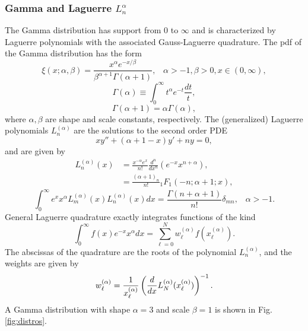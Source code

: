 \subsubsection{Gamma and Laguerre $L_n^\alpha$}
The Gamma distribution has support from 0 to $\infty$ and is characterized by Laguerre polynomials with the associated Gauss-Laguerre quadrature.  The pdf of the Gamma distribution has the form
\begin{equation}
\xi(x;\alpha,\beta)=\frac{x^\alpha e^{-x/\beta}}{\beta^{\alpha+1}\Gamma(\alpha+1)},
    \hspace{10pt}\alpha>-1,\beta>0,x\in(0,\infty),
\end{equation}
\begin{equation}
\Gamma(\alpha)\equiv\int_0^\infty t^\alpha e^{-t}\frac{dt}{t},
\end{equation}
\begin{equation}
\Gamma(\alpha+1)=\alpha\Gamma(\alpha),
\end{equation}
where $\alpha,\beta$ are shape and scale constants, respectively.  The (generalized) Laguerre polynomials $L^{(\alpha)}_n$ are the solutions to the second order PDE
\begin{equation}
xy''+(\alpha+1-x)y'+ny=0,
\end{equation}
and are given by
\begin{align}
L^{(\alpha)}_n(x)&=\frac{x^{-\alpha}e^x}{n!}\frac{d^n}{dx^n}\left(e^{-x}x^{n+\alpha}\right),\\
  &=\frac{(\alpha+1)_n}{n!} {}_1F_1(-n;\alpha+1;x),
\end{align}
\begin{equation}
\int_0^\infty e^x x^\alpha L^{(\alpha)}_m(x) L^{(\alpha)}_n(x)dx=\frac{\Gamma(n+\alpha+1)}{n!}\delta_{mn},
     \hspace{10pt}\alpha>-1.
\end{equation}
General Laguerre quadrature exactly integrates functions of the kind
\begin{equation}
\int_0^\infty  f(x)e^{-x} x^\alpha dx=\sum_{\ell=0}^N w^{(\alpha)}_\ell f(x^{(\alpha)}_\ell).
\end{equation}
The abscissas of the quadrature are the roots of the polynomial $L^{(\alpha)}_n$, and the weights are given by
\begin{equation}
w^{(\alpha)}_\ell=\frac{1}{x^{(\alpha)}_\ell}\left(\frac{d }{d x}L_N^{(\alpha)}(x^{(\alpha)}_\ell)\right)^{-1}.
\end{equation}
A Gamma distribution with shape $\alpha=3$ and scale $\beta=1$ is shown in Fig. \ref{fig:distros}.

